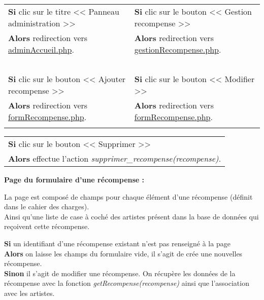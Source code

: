             \begin{center}
                \begin{tabular}{l | l}
                    \textbf{Si} clic sur le titre << Panneau administration >> & \textbf{Si} clic sur le bouton << Gestion recompense >> \\
                    \textbf{Alors} redirection vers \underline{adminAccueil.php}. & \textbf{Alors} redirection vers \underline{gestionRecompense.php}. \\ \\

                    \textbf{Si} clic sur le bouton << Ajouter recompense >> & \textbf{Si} clic sur le bouton << Modifier >> \\
                    \textbf{Alors} redirection vers \underline{formRecompense.php}. & \textbf{Alors} redirection vers \underline{formRecompense.php}. \\ \\
                \end{tabular}

                \begin{tabular}{l}
                    \textbf{Si} clic sur le bouton << Supprimer >> \\
                    \textbf{Alors} effectue l'action \emph{supprimer\_recompense(recompense)}.
                \end{tabular}
            \end{center}
            
            
        \clearpage
        
            \begin{paragraphe}
                \textbf{Page du formulaire d'une récompense :}
            \end{paragraphe}
            
            \begin{paragraphe}
                La page est composé de champs pour chaque élément d'une récompense (définit dans le cahier des charges). \\
                Ainsi qu'une liste de case à coché des artistes présent dans la base de données qui reçoivent cette récompense.
            \end{paragraphe}

            \begin{paragraphe}
                \textbf{Si} un identifiant d'une récompense existant n'est pas renseigné à la page \\
                \textbf{Alors} on laisse les champs du formulaire vide, il s'agit de crée une nouvelles récompense. \\
                \textbf{Sinon} il s'agit de modifier une récompense. On récupère les données de la récompense avec la fonction \emph{getRecompense(recompense)} ainsi que l'association avec les artistes.
            \end{paragraphe}
            
